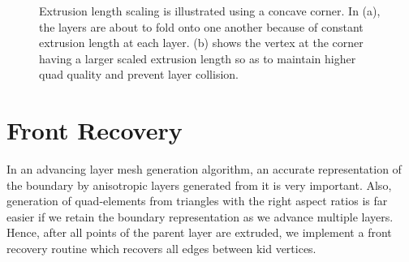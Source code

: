 \begin{figure}
\begin{subfigure}{0.5\textwidth}
\caption{}
\label{subfigure-extrusionScaling2}
\end{subfigure}
\caption{Extrusion length scaling is illustrated using a concave corner. In (a), the layers are about to fold onto one another because of constant extrusion length at each layer. (b) shows the vertex at the corner having a larger scaled extrusion length so as to maintain higher quad quality and prevent layer collision.}
\label{fig-extrusionScaling}
\end{figure}

\section{Front Recovery}


In an advancing layer mesh generation algorithm, an accurate representation of the boundary by anisotropic layers generated from it is very important. Also, generation of quad-elements from triangles with the right aspect ratios is far easier if we retain the boundary representation as we advance multiple layers. Hence, after all points of the parent layer are extruded, we implement a front recovery routine which recovers all edges between kid vertices.

